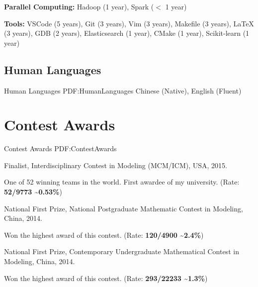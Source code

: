 \documentclass[letterpaper,10pt,oneside]{article}
\begin{document}
\begin{body}
\GapNoBreak
\BulletItem
\textbf{Parallel Computing:} Hadoop (1 year), Spark ($<$ 1 year)

\GapNoBreak
\BulletItem
\textbf{Tools:} VSCode (5 years), Git (3 years), Vim (3 years), Makefile (3 years), {\LaTeX} (3 years), GDB (2 years), Elasticsearch (1 year), CMake (1 year), Scikit-learn (1 year)

\BigGap
\subsection
{Human Languages}
{Human Languages}
{PDF:HumanLanguages}
\GapNoBreak
\BulletItem
Chinese (Native), English (Fluent)
\GapNoBreak


\section
{Contest Awards}
{Contest Awards}
{PDF:ContestAwards}


\BulletItem
Finalist, Interdisciplinary Contest in Modeling (MCM/ICM), USA, 2015.
\begin{detail}
\SubBulletItem
One of 52 winning teams in the world. First awardee of my university. (Rate: \textbf{52/9773 \textasciitilde0.53\%})
\end{detail}

\Gap
\BulletItem
National First Prize, National Postgraduate Mathematic Contest in Modeling, China, 2014.
\begin{detail}
\SubBulletItem
Won the highest award of this contest. 
(Rate: \textbf{120/4900 \textasciitilde2.4\%}) 
\end{detail}

\Gap
\BulletItem
National First Prize, Contemporary Undergraduate Mathematical Contest in Modeling, China, 2014.
\begin{detail}
\SubBulletItem
Won the highest award of this contest.
(Rate: \textbf{293/22233 \textasciitilde1.3\%})
\end{detail}



\end{body}
\end{document}
